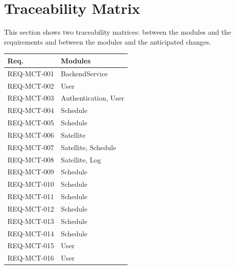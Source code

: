 \documentclass[12pt, titlepage]{article}
\begin{document}
\section{Traceability Matrix} \label{SecTM}

This section shows two traceability matrices: between the modules and the
requirements and between the modules and the anticipated changes.


 
\begin{table}[H]
\centering
\begin{tabular}{p{} p{}}
\toprule
\textbf{Req.} & \textbf{Modules}\\
\midrule

REQ-MCT-001 & BackendService  \\ 

REQ-MCT-002 & User \\ 

REQ-MCT-003 & Authentication, User \\ 

REQ-MCT-004 & Schedule \\ 

REQ-MCT-005 & Schedule \\ 

REQ-MCT-006 & Satellite \\ 

REQ-MCT-007 & Satellite, Schedule \\ 

REQ-MCT-008 & Satellite, Log \\ 

REQ-MCT-009 & Schedule \\ 

REQ-MCT-010 & Schedule \\ 

REQ-MCT-011 & Schedule \\ 

REQ-MCT-012 & Schedule \\ 

REQ-MCT-013 & Schedule \\ 

REQ-MCT-014 & Schedule \\ 

REQ-MCT-015 & User \\ 

REQ-MCT-016 & User \\ 


\end{tabular}
\end{table}
\end{document}
